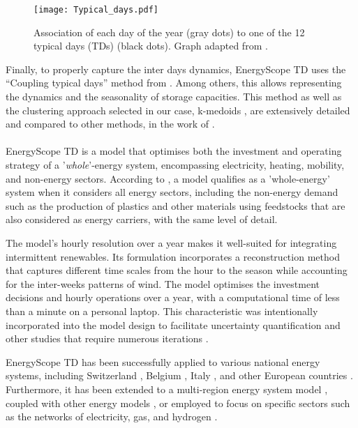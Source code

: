 \begin{figure}[htbp!]
\centering
\texttt{[image: Typical\_days.pdf]}
\caption{Association of each day of the year (gray dots) to one of the 12 typical days (TDs) (black dots). Graph adapted from \citet{limpens2019energyscope}.}
\label{fig:Typical_days}
\end{figure}

\newpage
Finally, to properly capture the inter days dynamics, EnergyScope TD uses the ``Coupling typical days'' method from \citet{Gabrielli2018}. Among others, this allows representing the dynamics and the seasonality of storage capacities. This method as well as the clustering approach selected in our case, \ie k-medoids \cite{Kaufman2009,Park2009}, are extensively detailed and compared to other methods, in the work of \citet{limpens2019energyscope}. \\

\\

\noindent
EnergyScope TD \cite{limpens2019energyscope} is a model that optimises both the investment and operating strategy of a '\emph{whole}'-energy system, encompassing electricity, heating, mobility, and non-energy sectors. According to \citet{contino2020whole}, a model qualifies as a 'whole-energy' system when it considers all energy sectors, including the non-energy demand such as the production of plastics and other materials using feedstocks that are also considered as energy carriers, with the same level of detail.

The model's hourly resolution over a year makes it well-suited for integrating intermittent renewables. Its formulation incorporates a reconstruction method that captures different time scales from the hour to the season while accounting for the inter-weeks patterns of wind. The model optimises the investment decisions and hourly operations over a year, with a computational time of less than a minute on a personal laptop. This characteristic was intentionally incorporated into the model design to facilitate uncertainty quantification and other studies that require numerous iterations \cite{rixhon2021role}.

EnergyScope TD has been successfully applied to various national energy systems, including Switzerland \cite{Limpens_role_2019,limpens2019energyscope}, Belgium \cite{Limpens2020}, Italy \cite{borasio2022deep}, and other European countries \cite{dommisse2020modelling}. Furthermore, it has been extended to a multi-region energy system model \cite{thiran2023validation}, coupled with other energy models \cite{pavivcevic2022bidirectionnal}, or employed to focus on specific sectors such as the networks of electricity, gas, and hydrogen \cite{schnidrig2023role}.\\

